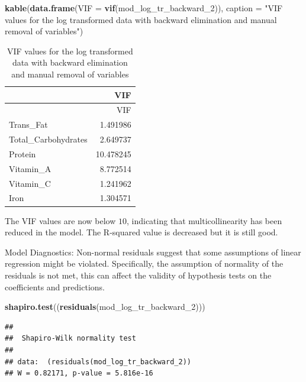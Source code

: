 \documentclass[
]{article}
\newenvironment{Shaded}{\begin{snugshade}}{\end{snugshade}}
\newcommand{\AttributeTok}[1]{\textcolor[rgb]{0.13,0.29,0.53}{#1}}
\newcommand{\FunctionTok}[1]{\textcolor[rgb]{0.13,0.29,0.53}{\textbf{#1}}}
\newcommand{\NormalTok}[1]{#1}
\newcommand{\StringTok}[1]{\textcolor[rgb]{0.31,0.60,0.02}{#1}}
\begin{document}
\begin{Shaded}
\begin{Highlighting}[]
\FunctionTok{kable}\NormalTok{(}\FunctionTok{data.frame}\NormalTok{(}\AttributeTok{VIF =} \FunctionTok{vif}\NormalTok{(mod\_log\_tr\_backward\_2)),}
      \AttributeTok{caption =} \StringTok{"VIF values for the log transformed data with backward }
\StringTok{      elimination and manual removal of variables"}\NormalTok{)}
\end{Highlighting}
\end{Shaded}

\begin{longtable}[]{@{}lr@{}}
\caption{VIF values for the log transformed data with backward
elimination and manual removal of variables}\tabularnewline
\toprule\noalign{}
& VIF \\
\midrule\noalign{}
\endfirsthead
\toprule\noalign{}
& VIF \\
\midrule\noalign{}
\endhead
\bottomrule\noalign{}
\endlastfoot
Trans\_Fat & 1.491986 \\
Total\_Carbohydrates & 2.649737 \\
Protein & 10.478245 \\
Vitamin\_A & 8.772514 \\
Vitamin\_C & 1.241962 \\
Iron & 1.304571 \\
\end{longtable}

The VIF values are now below \(10\), indicating that multicollinearity
has been reduced in the model. The R-squared value is decreased but it
is still good.

Model Diagnostics: Non-normal residuals suggest that some assumptions of
linear regression might be violated. Specifically, the assumption of
normality of the residuals is not met, this can affect the validity of
hypothesis tests on the coefficients and predictions.

\begin{Shaded}
\begin{Highlighting}[]
\FunctionTok{shapiro.test}\NormalTok{((}\FunctionTok{residuals}\NormalTok{(mod\_log\_tr\_backward\_2)))}
\end{Highlighting}
\end{Shaded}

\begin{verbatim}
## 
##  Shapiro-Wilk normality test
## 
## data:  (residuals(mod_log_tr_backward_2))
## W = 0.82171, p-value = 5.816e-16
\end{verbatim}
\end{document}
